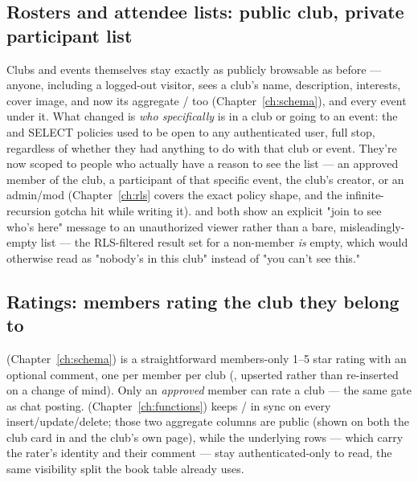 \subsection*{Rosters and attendee lists: public club, private participant list}

Clubs and events themselves stay exactly as publicly browsable as before — anyone, including a logged-out visitor, sees a club's name, description, interests, cover image, and now its aggregate / too (Chapter~\ref{ch:schema}), and every event under it. What changed is \emph{who specifically} is in a club or going to an event: the  and  SELECT policies used to be open to any authenticated user, full stop, regardless of whether they had anything to do with that club or event. They're now scoped to people who actually have a reason to see the list — an approved member of the club, a participant of that specific event, the club's creator, or an admin/mod (Chapter~\ref{ch:rls} covers the exact policy shape, and the infinite-recursion gotcha hit while writing it).  and  both show an explicit "join to see who's here" message to an unauthorized viewer rather than a bare, misleadingly-empty list — the RLS-filtered result set for a non-member \emph{is} empty, which would otherwise read as "nobody's in this club" instead of "you can't see this."

\subsection*{Ratings: members rating the club they belong to}

 (Chapter~\ref{ch:schema}) is a straightforward members-only 1--5 star rating with an optional comment, one per member per club (, upserted rather than re-inserted on a change of mind). Only an \emph{approved} member can rate a club — the same  gate as chat posting.  (Chapter~\ref{ch:functions}) keeps / in sync on every insert/update/delete; those two aggregate columns are public (shown on both the club card in  and the club's own page), while the underlying rows — which carry the rater's identity and their comment — stay authenticated-only to read, the same visibility split the book  table already uses.


